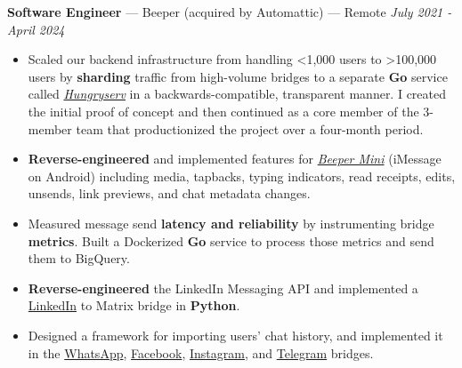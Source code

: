 \documentclass[10pt,letterpaper]{article}
\begin{document}
{\fontsize{11}{0}
\textbf{Software Engineer} --- Beeper (acquired by Automattic) --- Remote}
\hfill \textit{July 2021 - April 2024}
\begin{itemize}
    \item Scaled our backend infrastructure from handling \textless 1,000 users
        to \textgreater 100,000 users by \textbf{sharding} traffic from
        high-volume bridges to a separate \textbf{Go} service called
        \href{https://github.com/sumnerevans/hungryserv-presentation}{\textit{Hungryserv}}
        in a backwards-compatible, transparent manner. I created the initial
        proof of concept and then continued as a core member of the 3-member
        team that productionized the project over a four-month period.
    \item \textbf{Reverse-engineered} and implemented features for
        \href{https://blog.beeper.com/p/introducing-beeper-mini-get-blue}{\textit{Beeper Mini}}
        (iMessage on Android) including media, tapbacks, typing indicators, read
        receipts, edits, unsends, link previews, and chat metadata changes.
    \item Measured message send \textbf{latency and reliability} by
        instrumenting bridge \textbf{metrics}. Built a Dockerized \textbf{Go}
        service to process those metrics and send them to BigQuery.
    \item \textbf{Reverse-engineered} the LinkedIn Messaging API and implemented a
        \href{https://github.com/beeper/linkedin}{LinkedIn} to Matrix bridge in
        \textbf{Python}.
    \item Designed a framework for importing users' chat history, and
        implemented it in the
        \href{https://github.com/mautrix/whatsapp}{WhatsApp},
        \href{https://github.com/mautrix/facebook}{Facebook},
        \href{https://github.com/mautrix/instagram}{Instagram}, and
        \href{https://github.com/mautrix/telegramgo}{Telegram} bridges.
\end{itemize}
\end{document}
